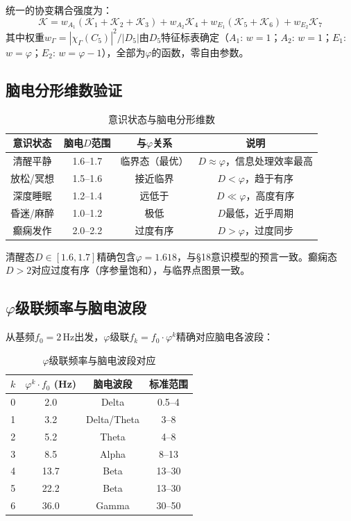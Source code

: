 \documentclass[12pt,a4paper,twocolumn]{article}
\renewcommand{\phi}{\varphi}
\begin{document}
统一的协变耦合强度为：
\begin{equation}
\mathcal{K} = w_{A_1}(\mathcal{K}_1 + \mathcal{K}_2 + \mathcal{K}_3) + w_{A_2}\mathcal{K}_4 + w_{E_1}(\mathcal{K}_5 + \mathcal{K}_6) + w_{E_2}\mathcal{K}_7
\end{equation}
其中权重$w_\Gamma = |\chi_\Gamma(C_5)|^2 / |D_5|$由$D_5$特征标表确定（$A_1$: $w=1$；$A_2$: $w=1$；$E_1$: $w=\phi$；$E_2$: $w=\phi-1$），全部为$\phi$的函数，零自由参数。

\subsection{脑电分形维数验证}
\label{subsec:eeg_verification}

\begin{table}[H]
\centering
\caption{意识状态与脑电分形维数}
\begin{tabular}{c|c|c|c}
\hline
\textbf{意识状态} & \textbf{脑电$D$范围} & \textbf{与$\phi$关系} & \textbf{说明} \\
\hline
清醒平静 & 1.6--1.7 & 临界态（最优） & $D \approx \phi$，信息处理效率最高 \\
放松/冥想 & 1.5--1.6 & 接近临界 & $D < \phi$，趋于有序 \\
深度睡眠 & 1.2--1.4 & 远低于 & $D \ll \phi$，高度有序 \\
昏迷/麻醉 & 1.0--1.2 & 极低 & $D$最低，近乎周期 \\
癫痫发作 & 2.0--2.2 & 过度有序 & $D > \phi$，过度同步 \\
\hline
\end{tabular}
\end{table}

清醒态$D \in [1.6, 1.7]$精确包含$\phi = 1.618$，与§18意识模型的预言一致。癫痫态$D > 2$对应过度有序（序参量饱和），与临界点图景一致。

\subsection{$\phi$级联频率与脑电波段}
\label{subsec:phi_cascade_eeg}

从基频$f_0 = 2$\,Hz出发，$\phi$级联$f_k = f_0 \cdot \phi^k$精确对应脑电各波段：
\begin{table}[H]
\centering
\caption{$\phi$级联频率与脑电波段对应}
\begin{tabular}{c|c|c|c}
\hline
$k$ & $\phi^k \cdot f_0$ (Hz) & \textbf{脑电波段} & \textbf{标准范围} \\
\hline
0 & 2.0 & Delta & 0.5--4 \\
1 & 3.2 & Delta/Theta & 3--8 \\
2 & 5.2 & Theta & 4--8 \\
3 & 8.5 & Alpha & 8--13 \\
4 & 13.7 & Beta & 13--30 \\
5 & 22.2 & Beta & 13--30 \\
6 & 36.0 & Gamma & 30--50 \\
\hline
\end{tabular}
\end{table}
\end{document}
